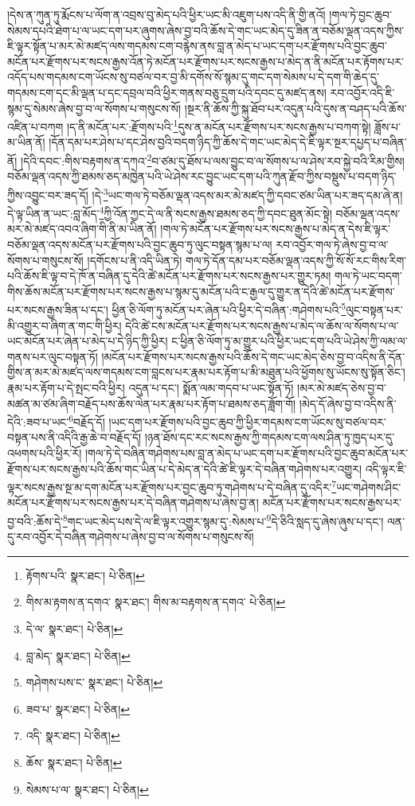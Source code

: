 །དེས་ན་ཀུན་ཏུ་རྨོངས་པ་ལོག་ན་འབྲས་བུ་མེད་པའི་ཕྱིར་ཡང་མི་འཇུག་པས་འདི་ནི་གྱི་ནའོ། །གལ་ཏེ་བྱང་ཆུབ་སེམས་དཔའི་ཐེག་པ་ལ་ཡང་དག་པར་ཞུགས་ཞེས་བྱ་བའི་ཆོས་དེ་གང་ཡང་མེད་དུ་ཟིན་ན་བཅོམ་ལྡན་འདས་ཀྱིས་ཇི་ལྟར་སྟོན་པ་མར་མེ་མཛད་ལས་གདམས་ངག་བརྙེས་ནས་བླ་ན་མེད་པ་ཡང་དག་པར་རྫོགས་པའི་བྱང་ཆུབ་མངོན་པར་རྫོགས་པར་སངས་རྒྱས་འོན་ཏེ་མངོན་པར་རྫོགས་པར་སངས་རྒྱས་པ་མེད་ན་ནི་མངོན་པར་རྟོགས་པར་འདོད་པས་གདམས་ངག་ཡོངས་སུ་བཙལ་བར་བྱ་མི་དགོས་སོ་སྙམ་དུ་གང་དག་སེམས་པ་དེ་དག་གི་ཆེད་དུ་གདམས་ངག་དང་མི་ལྡན་པ་དང་དབྲལ་བའི་ཕྱིར་གནས་བཅུ་དྲུག་པའི་དབང་དུ་མཛད་ནས། རབ་འབྱོར་འདི་ཇི་སྙམ་དུ་སེམས་ཞེས་བྱ་བ་ལ་སོགས་པ་གསུངས་སོ། །སྔར་ནི་ཆོས་ཀྱི་སྐུ་ཐོབ་པར་འདུན་པའི་དུས་ན་བཤད་པའི་ཆོས་འཛིན་པ་བཀག །ད་ནི་མངོན་པར་:རྫོགས་པའི་\footnote{རྟོགས་པའི་  སྣར་ཐང་།  པེ་ཅིན། }དུས་ན་མངོན་པར་རྫོགས་པར་སངས་རྒྱས་པ་བཀག་སྟེ། ཟློས་པ་མ་ཡིན་ནོ། །དོན་དམ་པར་ཤེས་པ་དང་ཤེས་བྱའི་བདག་ཉིད་ཀྱི་ཆོས་དེ་གང་ཡང་མེད་དེ་ཇི་ལྟར་སྔར་དཔྱད་པ་བཞིན་ནོ། །དེའི་དབང་:གིས་བརྟགས་ན་དཀའ་\footnote{གིས་མ་རྟགས་ན་དགའ་  སྣར་ཐང་། གིས་མ་བརྟགས་ན་དགའ་  པེ་ཅིན། }བ་ཙམ་དུ་ཐོས་པ་ལས་བྱུང་བ་ལ་སོགས་པ་ལ་ཤེས་རབ་སྐྱེ་བའི་རིམ་གྱིས། བཅོམ་ལྡན་འདས་ཀྱི་ཐམས་ཅད་མཁྱེན་པའི་ཡེ་ཤེས་རང་བྱུང་ཡང་དག་པའི་ཀུན་རྫོབ་ཀྱིས་བསྡུས་པ་བདག་ཉིད་ཀྱིས་འབྱུང་བར་ཟད་དོ། །དེ་\footnote{དེ་ལ་  སྣར་ཐང་།  པེ་ཅིན། }ཡང་གལ་ཏེ་བཅོམ་ལྡན་འདས་མར་མེ་མཛད་ཀྱི་དབང་ཙམ་ཡིན་པར་ཟད་དམ་ཞེ་ན། དེ་ལྟ་ཡིན་ན་ཡང་:བླ་མོད་\footnote{བླ་མེད་  སྣར་ཐང་།  པེ་ཅིན། }ཀྱི་འོན་ཀྱང་དེ་ལ་ནི་སངས་རྒྱས་ཐམས་ཅད་ཀྱི་དབང་ཐུན་མོང་སྟེ། བཅོམ་ལྡན་འདས་མར་མེ་མཛད་འབའ་ཞིག་གི་ནི་མ་ཡིན་ནོ། །གལ་ཏེ་མངོན་པར་རྫོགས་པར་སངས་རྒྱས་པ་མེད་ན་དེས་ཇི་ལྟར་བཅོམ་ལྡན་འདས་མངོན་པར་རྫོགས་པའི་བྱང་ཆུབ་ཏུ་ལུང་བསྟན་སྙམ་པ་ལ། རབ་འབྱོར་གལ་ཏེ་ཞེས་བྱ་བ་ལ་སོགས་པ་གསུངས་སོ། །དགོངས་པ་ནི་འདི་ཡིན་ཏེ། གལ་ཏེ་དོན་དམ་པར་བཅོམ་ལྡན་འདས་ཀྱི་སོ་སོ་རང་གིས་རིག་པའི་ཆོས་ཇི་ལྟ་བ་དེ་ཁོ་ན་བཞིན་དུ་དེའི་ཚེ་མངོན་པར་རྫོགས་པར་སངས་རྒྱས་པར་གྱུར་ཏམ། གལ་ཏེ་ཡང་བདག་གིས་ཆོས་མངོན་པར་རྫོགས་པར་སངས་རྒྱས་པ་སྙམ་དུ་མངོན་པའི་ང་རྒྱལ་དུ་གྱུར་ན་དེའི་ཚེ་མངོན་པར་རྫོགས་པར་སངས་རྒྱས་ཟིན་པ་དང་། ཕྱིན་ཅི་ལོག་ཏུ་མངོན་པར་ཞེན་པའི་ཕྱིར་དེ་བཞིན་:གཤེགས་པའི་\footnote{གཤེགས་པས་ང་  སྣར་ཐང་།  པེ་ཅིན། }ལུང་བསྟན་པར་མི་འགྱུར་བ་ཞིག་ན་གང་གི་ཕྱིར། དེའི་ཚེ་ངས་མངོན་པར་རྫོགས་པར་སངས་རྒྱས་པ་མེད་ལ་ཆོས་ལ་སོགས་པ་ལ་ཡང་མངོན་པར་ཞེན་པ་མེད་པ་དེ་ཉིད་ཀྱི་ཕྱིར། ང་ཕྱིན་ཅི་ལོག་ཏུ་མ་གྱུར་པའི་ཕྱིར་ཡང་དག་པའི་ཡེ་ཤེས་ཀྱི་ལམ་ལ་གནས་པར་ལུང་བསྟན་ཏོ། །མངོན་པར་རྫོགས་པར་སངས་རྒྱས་པའི་ཆོས་དེ་གང་ཡང་མེད་ཅེས་བྱ་བ་འདིས་ནི་དོན་གྱིས་ན་མར་མེ་མཛད་ལས་གདམས་ངག་བླངས་པར་རྣམ་པར་རྟོག་པ་མི་མཐུན་པའི་ཕྱོགས་སུ་ཡོངས་སུ་སྟོན་ཅིང་། རྣམ་པར་རྟོག་པ་དེ་སྤང་བའི་ཕྱིར། འདུན་པ་དང་། སྨོན་ལམ་གདབ་པ་ཡང་སྟོན་ཏོ། །མར་མེ་མཛད་ཅེས་བྱ་བ་མཚན་མ་ཙམ་ཞིག་བརྗོད་པས་ཆོས་ལེན་པར་རྣམ་པར་རྟོག་པ་ཐམས་ཅད་ཟློག་གོ། །མེད་དོ་ཞེས་བྱ་བ་འདིས་ནི་དེའི་:ཟབ་པ་ཡང་\footnote{ཟབ་པ་  སྣར་ཐང་།  པེ་ཅིན། }བརྗོད་དོ། །ཡང་དག་པར་རྫོགས་པའི་བྱང་ཆུབ་ཀྱི་ཕྱིར་གདམས་ངག་ཡོངས་སུ་བཙལ་བར་བསྟན་པས་ནི་འདིའི་རྒྱ་ཆེ་བ་བརྗོད་དོ། །ཉན་ཐོས་དང་རང་སངས་རྒྱས་ཀྱི་གདམས་ངག་ལས་ཤིན་ཏུ་ཁྱད་པར་དུ་འཕགས་པའི་ཕྱིར་རོ། །གལ་ཏེ་དེ་བཞིན་གཤེགས་པས་བླ་ན་མེད་པ་ཡང་དག་པར་རྫོགས་པའི་བྱང་ཆུབ་མངོན་པར་རྫོགས་པར་སངས་རྒྱས་པའི་ཆོས་གང་ཡིན་པ་དེ་མེད་ན་དེའི་ཚེ་ཇི་ལྟར་དེ་བཞིན་གཤེགས་པར་འགྱུར། འདི་ལྟར་ཇི་ལྟར་སངས་རྒྱས་སྔ་མ་དག་མངོན་པར་རྫོགས་པར་བྱང་ཆུབ་ཏུ་གཤེགས་པ་དེ་བཞིན་དུ་འདིར་\footnote{འདི་  སྣར་ཐང་།  པེ་ཅིན། }ཡང་གཤེགས་ཤིང་མངོན་པར་རྫོགས་པར་སངས་རྒྱས་པར་དེ་བཞིན་གཤེགས་པ་ཞེས་བྱ་ན། མངོན་པར་རྫོགས་པར་སངས་རྒྱས་པར་བྱ་བའི་:ཆོས་དེ་\footnote{ཆོས་  སྣར་ཐང་།  པེ་ཅིན། }གང་ཡང་མེད་པས་དེ་ལ་ཇི་ལྟར་འགྱུར་སྙམ་དུ་:སེམས་པ་\footnote{སེམས་པ་ལ་  སྣར་ཐང་།  པེ་ཅིན། }དེ་ཅིའི་སླད་དུ་ཞེས་ཞུས་པ་དང་། ལན་དུ་རབ་འབྱོར་དེ་བཞིན་གཤེགས་པ་ཞེས་བྱ་བ་ལ་སོགས་པ་གསུངས་སོ། 